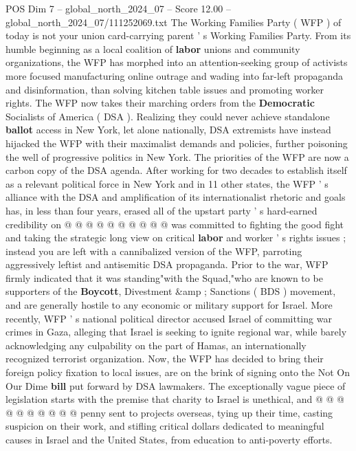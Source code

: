 \begin{textsample}{POS Dim 7 – global\_north\_2024\_07 – Score 12.00 – global\_north\_2024\_07/111252069.txt}  \label{ex:f7_pos_046}
The Working Families Party ( WFP ) of today is not your union card-carrying parent ' s Working Families Party.
From its humble beginning as a local coalition of \textbf{labor} unions and community organizations, the WFP has morphed into an attention-seeking group of activists more focused manufacturing online outrage and wading into far-left propaganda and disinformation, than solving kitchen table issues and promoting worker rights.
The WFP now takes their marching orders from the \textbf{Democratic} Socialists of America ( DSA ).
Realizing they could never achieve standalone \textbf{ballot} access in New York, let alone nationally, DSA extremists have instead hijacked the WFP with their maximalist demands and policies, further poisoning the well of progressive politics in New York.
The priorities of the WFP are now a carbon copy of the DSA agenda.
After working for two decades to establish itself as a relevant political force in New York and in 11 other states, the WFP ' s alliance with the DSA and amplification of its internationalist rhetoric and goals has, in less than four years, erased all of the upstart party ' s hard-earned credibility on @ @ @ @ @ @ @ @ @ @ was committed to fighting the good fight and taking the strategic long view on critical \textbf{labor} and worker ' s rights issues ; instead you are left with a cannibalized version of the WFP, parroting aggressively leftist and antisemitic DSA propaganda.
Prior to the war, WFP firmly indicated that it was standing"with the Squad,"who are known to be supporters of the \textbf{Boycott}, Divestment \&amp ; Sanctions ( BDS ) movement, and are generally hostile to any economic or military support for Israel.
More recently, WFP ' s national political director accused Israel of committing war crimes in Gaza, alleging that Israel is seeking to ignite regional war, while barely acknowledging any culpability on the part of Hamas, an internationally recognized terrorist organization.
Now, the WFP has decided to bring their foreign policy fixation to local issues, are on the brink of signing onto the Not On Our Dime \textbf{bill} put forward by DSA lawmakers.
The exceptionally vague piece of legislation starts with the premise that charity to Israel is unethical, and @ @ @ @ @ @ @ @ @ @ penny sent to projects overseas, tying up their time, casting suspicion on their work, and stifling critical dollars dedicated to meaningful causes in Israel and the United States, from education to anti-poverty efforts.

\end{textsample}
